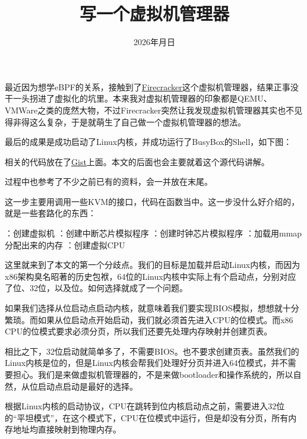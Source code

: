
\title {写一个虚拟机管理器}
\date {2026\sp 年\sp 月\sp 日}

最近因为想学\sp eBPF\sp 的关系，接触到了\sp \href{https://firecracker-microvm.github.io/}{Firecracker}\sp 这个虚拟机管理器，结果正事没干一头拐进了虚拟化的坑里。本来我对虚拟机管理器的印象都是\sp QEMU、VMWare\sp 之类的庞然大物，不过\sp Firecracker\sp 突然让我发现虚拟机管理器其实也不见得非得这么复杂，于是就萌生了自己做一个虚拟机管理器的想法。

最后的成果是成功启动了Linux内核，并成功运行了\sp BusyBox\sp 的\sp Shell，如下图：


相关的代码放在了\sp\href{https://gist.github.com/mistivia/701ce77756b3dd5e39581be9c5a2c30b}{Gist}\sp 上面。本文的后面也会主要就着这个源代码讲解。

过程中也参考了不少之前已有的资料，会一并放在末尾。


这一步主要用\sp 调用一些\sp KVM\sp 的接口，代码在\sp 函数当中。这一步没什么好介绍的，就是一些套路化的东西：

\bli
    ：创建虚拟机
    ：创建中断芯片模拟程序
    ：创建时钟芯片模拟程序
    ：加载用\sp mmap\sp 分配出来的内存
    ：创建虚拟\sp CPU
\eli


这里就来到了本文的第一个分歧点。我们的目标是加载并启动\sp Linux\sp 内核，而因为\sp x86\sp 架构臭名昭著的历史包袱，64\sp 位的\sp Linux\sp 内核中实际上有\sp 个启动点，分别对应了\sp 位、32\sp 位，以及\sp 位。如何选择就成了一个问题。

如果我们选择从\sp 位启动点启动内核，就意味着我们要实现\sp BIOS\sp 模拟，想想就十分繁琐。而如果从\sp 位启动点开始启动，我们就必须首先进入\sp CPU\sp 的\sp 位模式。而\sp x86 CPU\sp 的\sp 位模式要求必须分页，所以我们还要先处理内存映射并创建页表。

相比之下，32\sp 位启动就简单多了，不需要BIOS。也不要求创建页表。虽然我们的\sp Linux\sp 内核是\sp 位的，但是\sp Linux\sp 内核会帮我们处理好分页并进入64位模式，并不需要担心。我们是来做虚拟机管理器的，不是来做\sp bootloader\sp 和操作系统的，所以自然，从\sp 位启动点启动是最好的选择。

根据\sp Linux\sp 内核的启动协议，CPU\sp 在跳转到\sp 位内核启动点之前，需要进入32位的“平坦模式”，在这个模式下，CPU\sp 在\sp 位模式中运行，但是却没有分页，所有内存地址均直接映射到物理内存。

